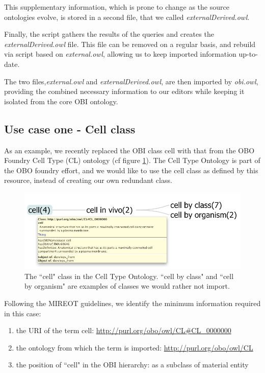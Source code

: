 \documentclass{elsart3p}    %
\begin{document}
This supplementary information, which is prone to change as the source ontologies evolve, is stored in a second file, that we called \emph{externalDerived.owl}.


Finally, the script gathers the results of the queries and creates the \emph{externalDerived.owl} file. 
This file can be removed on a regular basis, and rebuild via script based on \emph{external.owl}, allowing us to keep imported information up-to-date.

The two files,\emph{external.owl} and \emph{externalDerived.owl}, are then imported by \emph{obi.owl}, providing the combined necessary information to our editors while keeping it isolated from the core OBI ontology.


\subsection*{Use case one - Cell class}

As an example, we recently replaced the OBI class cell with that from the OBO Foundry Cell Type (CL) ontology (cf figure \ref{fig:cell}).
The Cell Type Ontology \cite{RefWorks:1559} is part of the OBO foundry effort, and we would like to use the cell class as defined by this resource, instead of creating our own redundant class.

\begin{figure}[t]
\centering \includegraphics*[width=1\columnwidth]{./figs/cell}
\caption{The ``cell" class in the Cell Type Ontology. ``cell by class" and ``cell by organism" are examples of classes we would rather not import.}
\label{fig:cell}
\end{figure}

Following the MIREOT guidelines, 
we identify the minimum information required in this case:  

\begin{enumerate}
\item the URI of the term cell: \url{http://purl.org/obo/owl/CL#CL_0000000}  
\item the ontology from which the term is imported: \url{http://purl.org/obo/owl/CL} 
\item the position of ``cell" in the OBI hierarchy: as a subclass of material entity
\end{enumerate}
\end{document}

